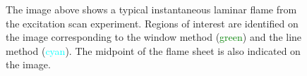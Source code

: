 \begin{figure}

\centering



\caption[Processing of the excitation scan images]{The image above shows a typical instantaneous laminar flame from the excitation scan experiment. Regions of interest are identified on the image corresponding to the window method (\textcolor{green}{green}) and the line method (\textcolor{cyan}{cyan}). The midpoint of the flame sheet is also indicated on the image.}

\label{fig:excitationScanFlame}

\end{figure}

